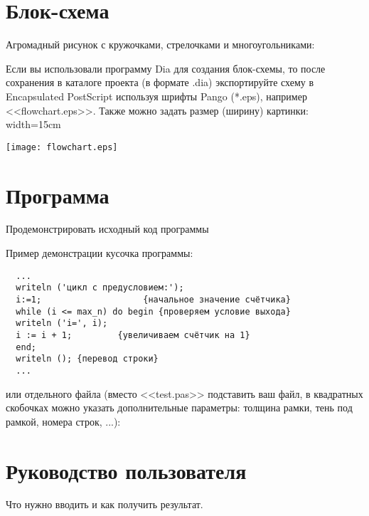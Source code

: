 \section{Блок-схема}
Агромадный рисунок с кружочками, стрелочками и многоугольниками:

Если вы использовали программу Dia для создания блок-схемы, то после
сохранения в каталоге проекта (в формате .dia) экспортируйте схему в
Encapsulated PostScript используя шрифты Pango (*.eps), например
<<flowchart.eps>>. Также можно задать размер (ширину) картинки:
width=15cm

\texttt{[image: flowchart.eps]}






\section{Программа}
Продемонстрировать исходный код программы

Пример демонстрации кусочка программы:
\begin{lstlisting}
  ...
  writeln ('цикл с предусловием:');
  i:=1;                    {начальное значение счётчика}
  while (i <= max_n) do begin {проверяем условие выхода}
  writeln ('i=', i);
  i := i + 1;         {увеличиваем счётчик на 1}
  end;
  writeln (); {перевод строки}
  ...
\end{lstlisting}


или отдельного файла (вместо <<test.pas>> подставить ваш файл, в
квадратных скобочках можно указать дополнительные параметры: толщина
рамки, тень под рамкой, номера строк, ...):








\section{Руководство пользователя}
Что нужно вводить и как получить результат.

